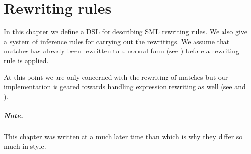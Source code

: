 \chapter{Rewriting rules}
In this chapter we define a DSL for describing SML rewriting rules. We also give
a system of inference rules for carrying out the rewritings. We assume that
matches has already been rewritten to a normal form (see )
before a rewriting rule is applied.

At this point we are only concerned with the rewriting of matches but our
implementation is geared towards handling expression rewriting as well (see
 and ).

\paragraph{Note.} This chapter was written at a much later time than
 which is why they differ so much in style.








